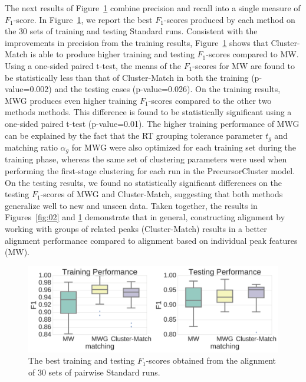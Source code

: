 The next results of Figure~\ref{fig:03} combine precision and recall into a single measure of $F_1$-score. In Figure~\ref{fig:03}, we report the best $F_1$-scores produced by each method on the 30 sets of training and testing Standard runs. Consistent with the improvements in precision from the training results, Figure~\ref{fig:03} shows that Cluster-Match is able to produce higher training and testing $F_1$-scores compared to MW. Using a one-sided paired t-test, the means of the $F_1$-scores for MW are found to be statistically less than that of Cluster-Match in both the training (p-value=0.002) and the testing cases (p-value=0.026). On the training results, MWG produces even higher training $F_1$-scores compared to the other two methods methods. This difference is found to be statistically significant using a one-sided paired t-test (p-value=0.01). The higher training performance of MWG can be explained by the fact that the RT grouping tolerance parameter $t_g$ and matching ratio $\alpha_g$ for MWG were also optimized for each training set during the training phase, whereas the same set of clustering parameters were used when performing the first-stage clustering for each run in the PrecursorCluster model. On the testing results, we found no statistically significant differences on the testing $F_1$-scores of MWG and Cluster-Match, suggesting that both methods generalize well to new and unseen data. Taken together, the results in Figures~\ref{fig:02} and \ref{fig:03} demonstrate that in general, constructing alignment by working with groups of related peaks (Cluster-Match) results in a better alignment performance compared to alignment based on individual peak features (MW).

\begin{figure}[!htbp]
\centering\includegraphics[width=1.0\linewidth]{06-precursor-cluster/figures/fig3.pdf}
\centering\caption{\label{fig:03} The best training and testing $F_1$-scores obtained from the alignment of 30 sets of pairwise Standard runs.}
\end{figure}

